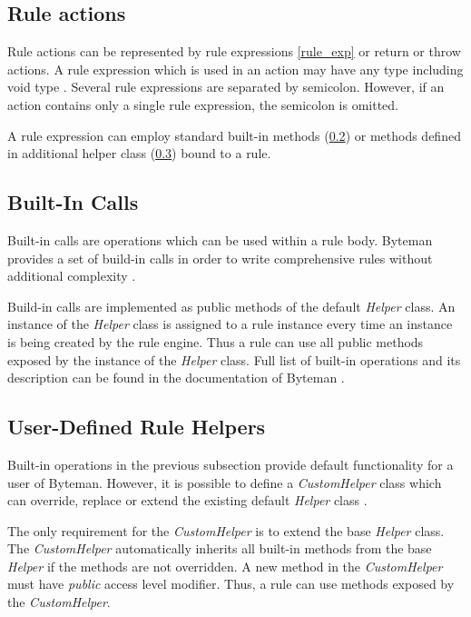 \documentclass[12pt,oneside]{fithesis2}
\begin{document}
\subsection{Rule actions}
Rule actions can be represented by rule expressions \ref{rule_exp} or return or throw actions. A rule expression which is used in an action may have any type including void type \cite[Rule actions]{byteman_doc}. Several rule expressions are separated by semicolon. However, if an action contains only a single rule expression, the semicolon is omitted.

A rule expression can employ standard built-in methods (\ref{built-in_calls}) or methods defined in additional helper class (\ref{user_defined_helper_class}) bound to a rule.

\subsection{Built-In Calls}
\label{built-in_calls}
Built-in calls are operations which can be used within a rule body. Byteman provides a set of build-in calls in order to write comprehensive rules without additional complexity \cite[Built-In Calls]{byteman_doc}.

Build-in calls are implemented as public methods of the default \textit{Helper} class. An instance of the \textit{Helper} class is assigned to a rule instance every time an instance is being created by the rule engine. Thus a rule can use all public methods exposed by the instance of the \textit{Helper} class. Full list of built-in operations and its description can be found in the documentation of Byteman \cite{byteman_doc}.

\subsection{User-Defined Rule Helpers}
\label{user_defined_helper_class}
Built-in operations in the previous subsection provide default functionality for a user of Byteman. However, it is possible to define a \textit{CustomHelper} class which can override, replace or extend the existing default \textit{Helper} class \cite[User-Defined Rule Helpers]{byteman_doc}.

The only requirement for the \textit{CustomHelper} is to extend the base \textit{Helper} class. The \textit{CustomHelper} automatically inherits all built-in methods from the base \textit{Helper} if the methods are not overridden. A new method in the \textit{CustomHelper} must have \textit{public} access level modifier. Thus, a rule can use methods exposed by the \textit{CustomHelper}.
\end{document}
